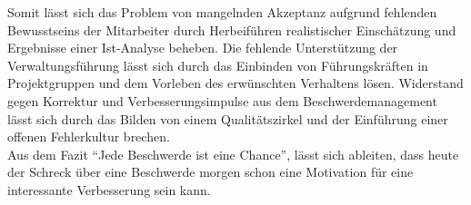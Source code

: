 \documentclass[a4paper,12pt]{article}
\begin{document}
	\noindent Somit lässt sich das Problem von mangelnden Akzeptanz aufgrund fehlenden Bewusstseins der Mitarbeiter durch Herbeiführen realistischer Einschätzung und Ergebnisse einer Ist-Analyse beheben.
	Die fehlende Unterstützung der Verwaltungsführung lässt sich durch das Einbinden von Führungskräften in Projektgruppen und dem Vorleben des erwünschten Verhaltens lösen.
	Widerstand gegen Korrektur und Verbesserungsimpulse aus dem Beschwerdemanagement lässt sich durch das Bilden von einem Qualitätszirkel und der Einführung einer offenen Fehlerkultur brechen. \cite{Studpraes}\\
	
	\noindent Aus dem Fazit \enquote{Jede Beschwerde ist eine Chance}, lässt sich ableiten, dass heute der Schreck über eine Beschwerde morgen schon eine Motivation für eine interessante Verbesserung sein kann.\\
	
	\nocite{Wikipedia}
	\nocite{Gabler}
	\nocite{Complaints}
	\nocite{Franke}
	\nocite{Studpraes}
	\nocite{Aufbau}
	\nocite{stauss2013beschwerdemanagement}
	\nocite{dgq}
	\newpage
	\printbibliography
\end{document}
